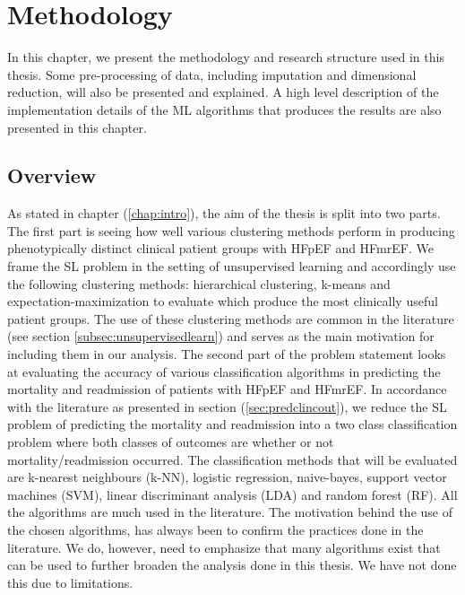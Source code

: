 \documentclass[../thesis.tex]{subfiles}
\begin{document}
\chapter{Methodology}
\label{chap:method}

\noindent In this chapter, we present the methodology and research structure used in this thesis. Some pre-processing of data, including imputation and dimensional reduction, will also be presented and explained. A high level description of the implementation details of the ML algorithms that produces the results are also presented in this chapter.

\section{Overview}
\label{sec:overview}

\noindent As stated in chapter (\ref{chap:intro}), the aim of the thesis is split into two parts. The first part is seeing how well various clustering methods perform in producing phenotypically distinct clinical patient groups with HFpEF and HFmrEF. We frame the SL problem in the setting of unsupervised learning and accordingly use the following clustering methods: hierarchical clustering, k-means and expectation-maximization to evaluate which produce the most clinically useful patient groups. The use of these clustering methods are common in the literature (see section \ref{subsec:unsupervisedlearn}) and serves as the main motivation for including them in our analysis. The second part of the problem statement looks at evaluating the accuracy of various classification algorithms in predicting the mortality and readmission of patients with HFpEF and HFmrEF. In accordance with the literature as presented in section (\ref{sec:predclincout}), we reduce the SL problem of predicting the mortality and readmission into a two class classification problem where both classes of outcomes are whether or not mortality/readmission occurred. The classification methods that will be evaluated are k-nearest neighbours (k-NN), logistic regression, naive-bayes, support vector machines (SVM), linear discriminant analysis (LDA) and random forest (RF). All the algorithms are much used in the literature. The motivation behind the use of the chosen algorithms, has always been to confirm the practices done in the literature. We do, however, need to emphasize that many algorithms exist that can be used to further broaden the analysis done in this thesis. We have not done this due to limitations.
\end{document}
